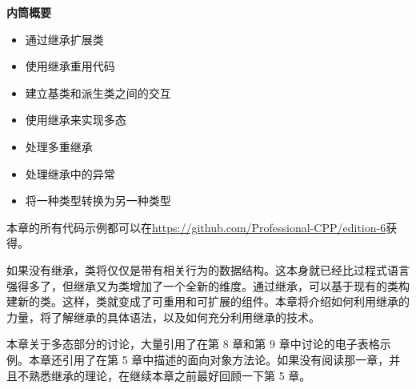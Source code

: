 \noindent
\textbf{内筒概要}

\begin{itemize}
\item
通过继承扩展类

\item
使用继承重用代码

\item
建立基类和派生类之间的交互

\item
使用继承来实现多态

\item
处理多重继承

\item
处理继承中的异常

\item
将一种类型转换为另一种类型
\end{itemize}

本章的所有代码示例都可以在\url{https://github.com/Professional-CPP/edition-6}获得。

如果没有继承，类将仅仅是带有相关行为的数据结构。这本身就已经比过程式语言强得多了，但继承又为类增加了一个全新的维度。通过继承，可以基于现有的类构建新的类。这样，类就变成了可重用和可扩展的组件。本章将介绍如何利用继承的力量，将了解继承的具体语法，以及如何充分利用继承的技术。

本章关于多态部分的讨论，大量引用了在第 8 章和第 9 章中讨论的电子表格示例。本章还引用了在第 5 章中描述的面向对象方法论。如果没有阅读那一章，并且不熟悉继承的理论，在继续本章之前最好回顾一下第 5 章。






























